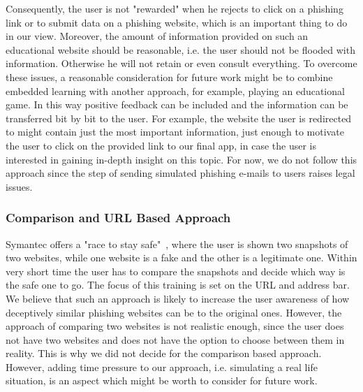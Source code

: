Consequently, the user is not "rewarded" when he rejects to click on a phishing link or to submit data on a phishing website, which is an important thing to do in our view. 
Moreover, the amount of information provided on such an educational website should be reasonable, i.e. the user should not be flooded with information. 
Otherwise he will not retain or even consult everything. 
To overcome these issues, a reasonable consideration for future work might be to combine embedded learning with another approach, for example, playing an educational game. 
In this way positive feedback can be included and the information can be transferred bit by bit to the user. 
For example, the website the user is redirected to might contain just the most important information, just enough to motivate the user to click on the provided link to our final app, in case the user is interested in gaining in-depth insight on this topic. 
For now, we do not follow this approach since the step of sending simulated phishing e-mails to users raises legal issues.

\subsubsection{Comparison and URL Based Approach}
Symantec offers a "race to stay safe"~\cite{staysafeonline}, where the user is shown two snapshots of two websites, while one website is a fake and the other is a legitimate one. 
Within very short time the user has to compare the snapshots and decide which way is the safe one to go. 
The focus of this training is set on the URL and address bar. 
We believe that such an approach is likely to increase the user awareness of how deceptively similar phishing websites can be to the original ones. 
However, the approach of comparing two websites is not realistic enough, since the user does not have two websites and does not have the option to choose between them in reality. 
This is why we did not decide for the comparison based approach. 
However, adding time pressure to our approach, i.e. simulating a real life situation, is an aspect which might be worth to consider for future work.

